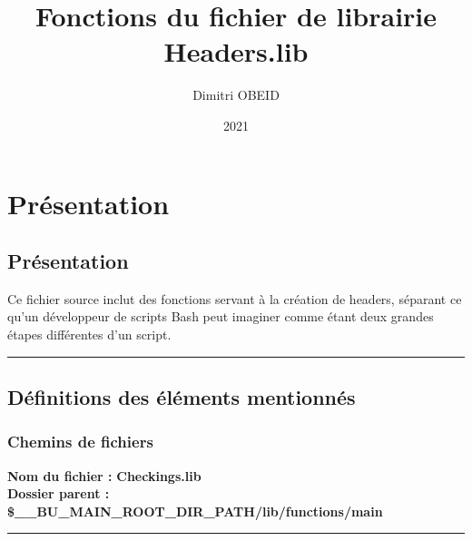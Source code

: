 \documentclass[a4paper,10pt]{article}
\title{\color{red}Fonctions du fichier de librairie \color{lime}Headers.lib\color{white}}
\author{Dimitri OBEID}
\date{2021}
\begin{document}
 \maketitle
 \tableofcontents
 \newpage

\color{red}
\section{Présentation}\color{white}

\color{green}
\subsection{Présentation}\color{white}

\begin{justify}
    Ce fichier source inclut des fonctions servant à la création de headers, séparant ce qu'un développeur de scripts Bash peut imaginer comme étant deux grandes étapes différentes d'un script.
\end{justify}




\color{green}\par\noindent\rule{\textwidth}{0.4pt}\color{white}

\color{green}
\subsection{Définitions des éléments mentionnés}\color{white}

\color{blue}
\subsubsection{Chemins de fichiers}\color{white}

\textbf{Nom du fichier :} \textbf{\color{lime}Checkings.lib\color{white}}\\[1\baselineskip]

\textbf{Dossier parent :} \textbf{\color{orange}\$\_\_BU\_MAIN\_ROOT\_DIR\_PATH\color{lime}/lib/functions/main\color{white}}\\[1\baselineskip]



\color{lime}\par\noindent\rule{\textwidth}{0.4pt}\color{white}\\[1\baselineskip]
\end{document}
